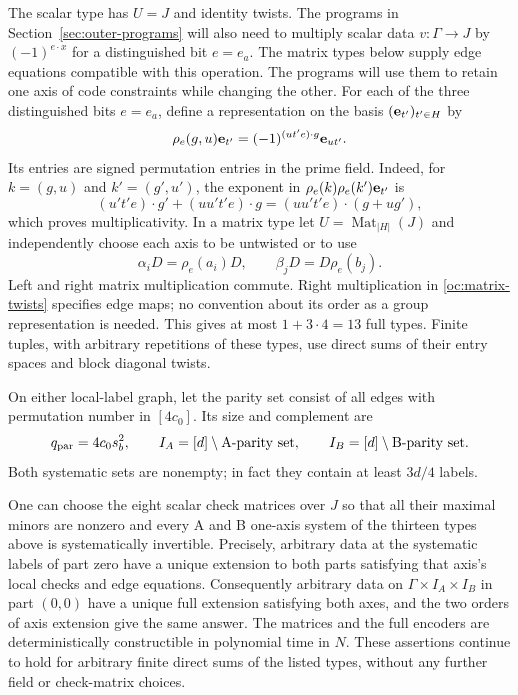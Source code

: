 The scalar type has $U=J$ and identity twists.  The programs in
Section~\ref{sec:outer-programs} will also need to multiply scalar
data $v:\Gamma\to J$ by $(-1)^{e\cdot x}$ for a distinguished bit
$e=e_a$.  The matrix types below supply edge equations compatible
with this operation.  The programs will use them to retain one axis
of code constraints while changing the other.
For each of the three distinguished bits $e=e_a$, define a
representation on the basis
$({\bf e}_{t'})_{t'\in H}$ by
\begin{equation}\label{oc:rho}
 \rho_e(g,u){\bf e}_{t'}
   =(-1)^{(ut'e)\cdot g}{\bf e}_{ut'}.
\end{equation}
Its entries are signed permutation entries in the prime field.
Indeed, for $k=(g,u)$ and $k'=(g',u')$, the exponent in
$\rho_e(k)\rho_e(k'){\bf e}_{t'}$ is
\[
 (u't'e)\cdot g'+(uu't'e)\cdot g
  =(uu't'e)\cdot(g+ug'),
\]
which proves multiplicativity.  In a matrix type let
$U=\operatorname{Mat}_{|H|}(J)$ and independently choose each axis
to be untwisted or to use
\begin{equation}\label{oc:matrix-twists}
 \alpha_i D=\rho_e(a_i)D,
 \qquad \beta_j D=D\rho_e(b_j).
\end{equation}
Left and right matrix multiplication commute.  Right multiplication
in \eqref{oc:matrix-twists} specifies edge maps; no convention about
its order as a group representation is needed.  This gives at most
$1+3\cdot4=13$ full types.  Finite tuples, with arbitrary repetitions
of these types, use direct sums of their entry spaces and block
diagonal twists.

On either local-label graph, let the parity set consist of all edges
with permutation number in $[4c_0]$.  Its size and complement are
\begin{equation}\label{oc:parity-set}
 q_{\rm par}=4c_0s_b^2,\qquad
 I_A=[d]\setminus\text{A-parity set},\qquad
 I_B=[d]\setminus\text{B-parity set}.
\end{equation}
Both systematic sets are nonempty; in fact they contain at least
$3d/4$ labels.

\begin{lemma}\label{oc:systematic}
One can choose the eight scalar check matrices over $J$ so that all
their maximal minors are nonzero and every A and B one-axis system
of the thirteen types above is systematically invertible.  Precisely,
arbitrary data at the systematic labels of part zero have a unique
extension to both parts satisfying that axis's local checks and edge
equations.  Consequently arbitrary data on
$\Gamma\times I_A\times I_B$ in part $(0,0)$ have a unique full
extension satisfying both axes, and the two orders of axis extension
give the same answer.  The matrices and the full encoders are
deterministically constructible in polynomial time in $N$.  These
assertions continue to hold for arbitrary finite direct sums of the
listed types, without any further field or check-matrix choices.
\end{lemma}

